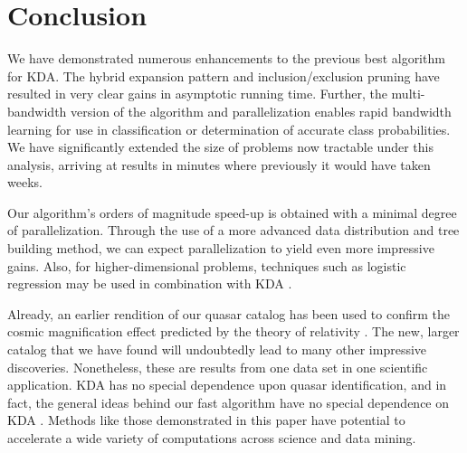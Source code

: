 \documentclass[twoside,leqno,twocolumn]{article}
\begin{document}

\section{Conclusion}
We have demonstrated numerous enhancements to the previous best
algorithm for KDA.  The hybrid expansion pattern and
inclusion/exclusion pruning have resulted in very clear gains in
asymptotic running time.  Further, the multi-bandwidth version of the
algorithm and parallelization enables rapid bandwidth learning for use
in classification or determination of accurate class probabilities.
We have significantly extended the size of problems now tractable
under this analysis, arriving at results in minutes where previously
it would have taken weeks.

Our algorithm's orders of magnitude speed-up is obtained with a
minimal degree of parallelization.  Through the use of a more advanced
data distribution and tree building method, we can expect
parallelization to yield even more impressive gains.  Also, for
higher-dimensional problems, techniques such as logistic regression
may be used in combination with KDA \cite{gray-highdimensional}.

Already, an earlier rendition of our quasar catalog has been used to
confirm the cosmic magnification effect predicted by the theory of
relativity \cite{nature05}.  The new, larger catalog that we have
found will undoubtedly lead to many other impressive discoveries.
Nonetheless, these are results from one data set in one scientific
application.  KDA has no special dependence upon quasar
identification, and in fact, the general ideas behind our fast
algorithm have no special dependence on KDA \cite{nips2000paper}.
Methods like those demonstrated in this paper have potential to
accelerate a wide variety of computations across science and data
mining.
\end{document}

